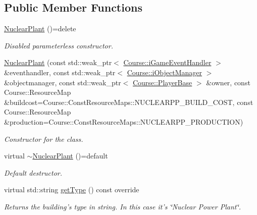 \subsection*{Public Member Functions}
\begin{DoxyCompactItemize}
\item 
\hypertarget{class_student_1_1_nuclear_plant_ac7cdd665727906c8e373c0a7d8456589}{\hyperlink{class_student_1_1_nuclear_plant_ac7cdd665727906c8e373c0a7d8456589}{Nuclear\-Plant} ()=delete}\label{class_student_1_1_nuclear_plant_ac7cdd665727906c8e373c0a7d8456589}

\begin{DoxyCompactList}\small\item\em Disabled parameterless constructor. \end{DoxyCompactList}\item 
\hyperlink{class_student_1_1_nuclear_plant_a869b79d07813643809ff7adec42bb8b5}{Nuclear\-Plant} (const std\-::weak\-\_\-ptr$<$ \hyperlink{class_course_1_1i_game_event_handler}{Course\-::i\-Game\-Event\-Handler} $>$ \&eventhandler, const std\-::weak\-\_\-ptr$<$ \hyperlink{class_course_1_1i_object_manager}{Course\-::i\-Object\-Manager} $>$ \&objectmanager, const std\-::weak\-\_\-ptr$<$ \hyperlink{class_course_1_1_player_base}{Course\-::\-Player\-Base} $>$ \&owner, const Course\-::\-Resource\-Map \&buildcost=Course\-::\-Const\-Resource\-Maps\-::\-N\-U\-C\-L\-E\-A\-R\-P\-P\-\_\-\-B\-U\-I\-L\-D\-\_\-\-C\-O\-S\-T, const Course\-::\-Resource\-Map \&production=Course\-::\-Const\-Resource\-Maps\-::\-N\-U\-C\-L\-E\-A\-R\-P\-P\-\_\-\-P\-R\-O\-D\-U\-C\-T\-I\-O\-N)
\begin{DoxyCompactList}\small\item\em Constructor for the class. \end{DoxyCompactList}\item 
\hypertarget{class_student_1_1_nuclear_plant_aa6aedb0acf4aaa517cb32c75a723766f}{virtual \hyperlink{class_student_1_1_nuclear_plant_aa6aedb0acf4aaa517cb32c75a723766f}{$\sim$\-Nuclear\-Plant} ()=default}\label{class_student_1_1_nuclear_plant_aa6aedb0acf4aaa517cb32c75a723766f}

\begin{DoxyCompactList}\small\item\em Default destructor. \end{DoxyCompactList}\item 
virtual std\-::string \hyperlink{class_student_1_1_nuclear_plant_a2dfb7f93c216ca4c76507a3d4a1fa530}{get\-Type} () const override
\begin{DoxyCompactList}\small\item\em Returns the building's type in string. In this case it's \char`\"{}\-Nuclear Power Plant\char`\"{}. \end{DoxyCompactList}\end{DoxyCompactItemize}
